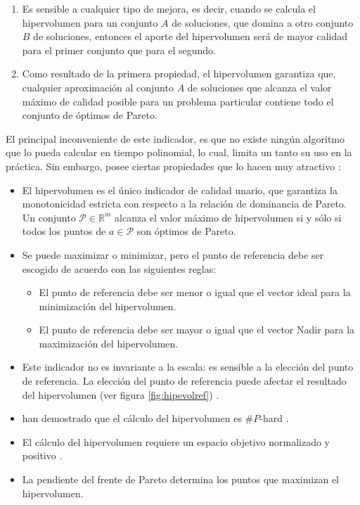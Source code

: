   \begin{enumerate}
   \item  Es sensible a cualquier tipo de mejora, es decir, cuando se calcula el hipervolumen para un conjunto $A$ 
   de soluciones, que domina a otro conjunto $B$ de soluciones, entonces el aporte del hipervolumen ser\'a de mayor 
   calidad para el primer conjunto que para el segundo.
   \item Como resultado de la primera propiedad, el hipervolumen garantiza que, cualquier aproximaci\'on al conjunto 
   $A$ de soluciones que alcanza el valor m\'aximo de calidad posible para un problema particular contiene todo el 
   conjunto de \'optimos de Pareto. 
  \end{enumerate}

  El principal inconveniente de este indicador, es que no existe ning\'un algoritmo que lo pueda calcular en tiempo polinomial, 
  lo cual, limita un tanto su uso en la pr\'actica. Sin embargo, posee ciertas propiedades que lo hacen muy atractivo \cite{Cynthia01}:

  \begin{itemize}
   \item El hipervolumen es el \'unico indicador de calidad unario, que garantiza la monotonicidad estricta 
   con respecto a la relaci\'on de dominancia de Pareto. Un conjunto $\mathcal{P} \in\mathbb{R}^m $ alcanza el valor m\'aximo 
   de hipervolumen si y s\'olo si todos los puntos de $a \in \mathcal{P}$ son \'optimos de Pareto.
   \item Se puede maximizar o minimizar, pero el punto de referencia debe ser escogido de acuerdo con las siguientes reglas:
   \begin{itemize}
    \item El punto de referencia debe ser menor o igual que el vector ideal para la minimizaci\'on del hipervolumen.
    \item El punto de referencia debe ser mayor o igual que el vector Nadir para la maximizaci\'on del hipervolumen.
   \end{itemize}
    \item Este indicador no es invariante a la escala: es sensible a la elecci\'on del punto de referencia. 
    La elecci\'on del punto de referencia puede afectar el resultado del hipervolumen  (ver figura \ref{fig:hipevolref}) 
    \cite{Edgar01}.
  \item \cite{BringmannF08} han demostrado que el c\'alculo del hipervolumen es $\#P$-hard .
   \item El c\'alculo del hipervolumen requiere un espacio objetivo normalizado y positivo \cite{Emmerich05anemo}.
   \item La pendiente del frente de Pareto determina los puntos que maximizan el hipervolumen.
  \end{itemize}

